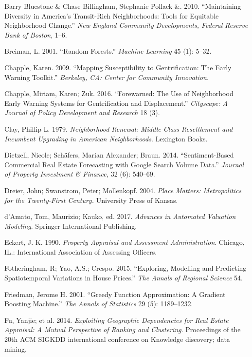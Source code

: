 \documentclass[]{article}
\begin{document}
\hypertarget{ref-Pollack2010}{}
Barry Bluestone \& Chase Billingham, Stephanie Pollack \&. 2010.
``Maintaining Diversity in America's Transit-Rich Neighborhoods: Tools
for Equitable Neighborhood Change.'' \emph{New England Community
Developments, Federal Reserve Bank of Boston}, 1--6.

\hypertarget{ref-Breiman2001}{}
Breiman, L. 2001. ``Random Forests.'' \emph{Machine Learning} 45 (1):
5--32.

\hypertarget{ref-Chapple2009}{}
Chapple, Karen. 2009. ``Mapping Susceptibility to Gentrification: The
Early Warning Toolkit.'' \emph{Berkeley, CA: Center for Community
Innovation.}

\hypertarget{ref-Chapple2016}{}
Chapple, Miriam, Karen; Zuk. 2016. ``Forewarned: The Use of Neighborhood
Early Warning Systems for Gentrification and Displacement.''
\emph{Cityscape: A Journal of Policy Development and Research} 18 (3).

\hypertarget{ref-Clay1979}{}
Clay, Phillip L. 1979. \emph{Neighborhood Renewal: Middle-Class
Resettlement and Incumbent Upgrading in American Neighborhoods}.
Lexington Books.

\hypertarget{ref-Dietzell2014}{}
Dietzell, Nicole; Schäfers, Marian Alexander; Braun. 2014.
``Sentiment-Based Commercial Real Estate Forecasting with Google Search
Volume Data.'' \emph{Journal of Property Investment \& Finance,} 32 (6):
540--69.

\hypertarget{ref-Dreier2004}{}
Dreier, John; Swanstrom, Peter; Mollenkopf. 2004. \emph{Place Matters:
Metropolitics for the Twenty-First Century.} University Press of Kansas.

\hypertarget{ref-Springer2017}{}
d'Amato, Tom, Maurizio; Kauko, ed. 2017. \emph{Advances in Automated
Valuation Modeling}. Springer International Publishing.

\hypertarget{ref-Eckert1990}{}
Eckert, J. K. 1990. \emph{Property Appraisal and Assessment
Administration}. Chicago, IL.: International Association of Assessing
Officers.

\hypertarget{ref-Fotheringham2015}{}
Fotheringham, R; Yao, A.S.; Crespo. 2015. ``Exploring, Modelling and
Predicting Spatiotemporal Variations in House Prices.'' \emph{The Annals
of Regional Science} 54.

\hypertarget{ref-Friedman2001}{}
Friedman, Jerome H. 2001. ``Greedy Function Approximation: A Gradient
Boosting Machine.'' \emph{The Annals of Statistics} 29 (5): 1189--1232.

\hypertarget{ref-Fu2014}{}
Fu, Yanjie; et al. 2014. \emph{Exploiting Geographic Dependencies for
Real Estate Appraisal: A Mutual Perspective of Ranking and Clustering}.
Proceedings of the 20th ACM SIGKDD international conference on Knowledge
discovery; data mining.
\end{document}
